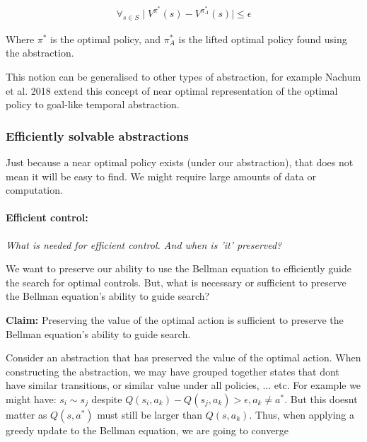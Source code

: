 \begin{align}
\forall_{s\in S} \mid V^{\pi^* }(s) - V^{\pi_{A}^* }(s) \mid \le \epsilon
\end{align}

Where $\pi^{* }$ is the optimal policy, and $\pi_{A}^{* }$ is the lifted optimal
policy found using the abstraction.

This notion can be generalised to other types of abstraction, for example
Nachum et al. 2018 \cite{Nachum2018} extend this concept of near optimal
representation of the optimal policy to goal-like temporal abstraction. \footnotemark[13]


\subsubsection{Efficiently solvable abstractions}

Just because a near optimal policy exists (under our abstraction), that does not mean it will be easy to find.
We might require large amounts of data or computation.

\paragraph{Efficient control:} \textit{What is needed for efficient control. And when is 'it' preserved?}

We want to preserve our ability to use the Bellman equation to efficiently guide the search for optimal controls.
But, what is necessary or sufficient to preserve the Bellman equation's ability to guide search?

\begin{displayquote}
\textbf{Claim:} Preserving the value of the optimal action is sufficient to preserve the Bellman equation's ability to guide search.
\end{displayquote}

Consider an abstraction that has preserved the value of the optimal action.
When constructing the abstraction, we may have grouped together states that dont have similar transitions, or similar value under all policies, ... etc.
For example we might have: $s_i \sim s_j$ despite $Q(s_i, a_k) - Q(s_j, a_k) > \epsilon, a_k \neq a^{* }$.
But this doesnt matter as $Q(s, a^{* })$ must still be larger than $Q(s, a_k)$.
Thus, when applying a greedy update to the Bellman equation, we are going to converge
\footnotemark[26]

